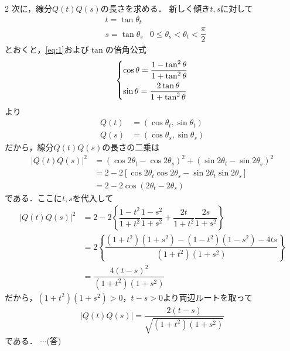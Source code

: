 \documentclass[../../main.tex]{subfiles}
\begin{document}
\begin{multicols}{2}
  次に，線分$Q(t)Q(s)$の長さを求める．
  新しく傾き$t,s$に対して
  \begin{align}
    & t = \tan \theta_{t} &                                               \\
    & s = \tan \theta_{s} & 0 \le \theta_{s} < \theta_{t} < \dfrac{\pi}{2}
  \end{align}
  とおくと，\cref{eq:1}および$\tan$の倍角公式
  \begin{align}
    \begin{dcases}
      \cos \theta = \dfrac{1-\tan^2\theta}{1+\tan^2\theta} \\
      \sin \theta = \dfrac{2\tan\theta}{1+\tan^2\theta}
    \end{dcases} \label{eq:2}
  \end{align}
  より
  \begin{align}
    Q(t) & = \left(\cos\theta_{t},\sin\theta_{t}\right) \\
    Q(s) & = \left(\cos\theta_{s},\sin\theta_{s}\right)
  \end{align}
  だから，線分$Q(t)Q(s)$の長さの二乗は
  \begin{align}
    |Q(t)Q(s)|^2
    & = (\cos 2\theta_{t} - \cos 2\theta_{s})^2 + (\sin 2\theta_{t} - \sin 2\theta_{s})^2        \\
    & = 2 - 2 \left[\cos 2\theta_{t} \cos 2\theta_{s} - \sin 2\theta_{t} \sin 2\theta_{s}\right] \\
    & = 2 - 2 \cos (2\theta_{t} - 2\theta_{s}) \label{eq:3}
  \end{align}
  である．ここに$t,s$を代入して
  \begin{align}
    |Q(t)Q(s)|^2
    & = 2 - 2 \left\{ \dfrac{1-t^2}{1+t^2} \dfrac{1-s^2}{1+s^2} + \dfrac{2t}{1+t^2} \dfrac{2s}{1+s^2} \right\} \\
    & = 2 \left\{ \dfrac{(1+t^2)(1+s^2)-(1-t^2)(1-s^2)-4ts}{(1+t^2)(1+s^2)} \right\}                        \\
    & = \dfrac{4(t-s)^2}{(1+t^2)(1+s^2)}
  \end{align}
  だから，$(1+t^2)(1+s^2)>0$，$t-s>0$より両辺ルートを取って
  \begin{align}
    |Q(t)Q(s)| = \dfrac{2(t-s)}{\sqrt{(1+t^2)(1+s^2)}}
  \end{align}
  である．  $\cdots$(答)


\end{multicols}
\end{document}
